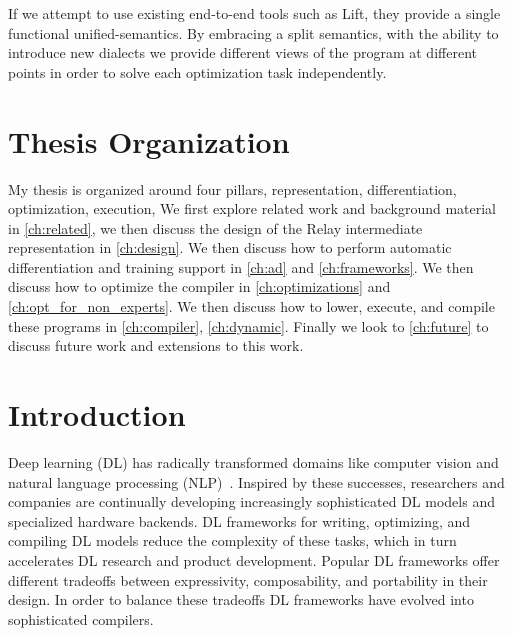 If we attempt to use existing end-to-end tools such as Lift, they provide a single functional unified-semantics. By embracing a split semantics, with the ability to introduce new dialects we provide different views of the program at different points in order to solve each optimization task independently.


\section{Thesis Organization}

My thesis is organized around four pillars, representation, differentiation, optimization, execution,
We first explore related work and background material
  in \ref{ch:related}, we then discuss the design of the Relay intermediate representation in \ref{ch:design}.
We then discuss how to perform automatic differentiation and training support in \ref{ch:ad} and
  \ref{ch:frameworks}.
We then discuss how to optimize the compiler in \ref{ch:optimizations} and \ref{ch:opt_for_non_experts}.
We then discuss how to lower, execute, and compile these programs in
\ref{ch:compiler}, \ref{ch:dynamic}.
Finally we look to \ref{ch:future} to discuss future work and extensions to this work.







\section{Introduction}
\label{sec:intro}

Deep learning (DL) has radically transformed domains like
  computer vision and
  natural language processing (NLP)~\citep{yolo, recent_trends_in_nlp}.
Inspired by these successes,
  researchers and companies are continually
  developing increasingly sophisticated DL models and
  specialized hardware backends.
DL frameworks for writing, optimizing, and compiling DL models
  reduce the complexity of these tasks,
  which in turn accelerates DL research and product development.
Popular DL frameworks offer different tradeoffs between
  expressivity, composability, and portability in their design.
In order to balance these tradeoffs DL frameworks have
  evolved into sophisticated compilers.

